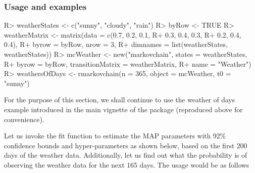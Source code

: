 \documentclass[
  nojss]{jss}
\begin{document}
\hypertarget{usage-and-examples}{%
\subsubsection{Usage and examples}\label{usage-and-examples}}

\begin{CodeChunk}

\begin{CodeInput}
R> weatherStates <- c("sunny", "cloudy", "rain")
R> byRow <- TRUE
R> weatherMatrix <- matrix(data = c(0.7, 0.2, 0.1, 
R+                                  0.3, 0.4, 0.3, 
R+                                  0.2, 0.4, 0.4), 
R+                         byrow = byRow, nrow = 3, 
R+                         dimnames = list(weatherStates, weatherStates))
R> mcWeather <- new("markovchain", states = weatherStates, 
R+                  byrow = byRow, transitionMatrix = weatherMatrix, 
R+                  name = "Weather")      
R> weathersOfDays <- rmarkovchain(n = 365, object = mcWeather, t0 = "sunny")
\end{CodeInput}
\end{CodeChunk}

For the purpose of this section, we shall continue to use the weather of days example introduced in the main vignette of the package (reproduced above for convenience).

Let us invoke the fit function to estimate the MAP parameters with 92\% confidence bounds and hyper-parameters as shown below, based on the first 200 days of the weather data. Additionally, let us find out what the probability is of observing the weather data for the next 165 days. The usage would be as follows
\end{document}
